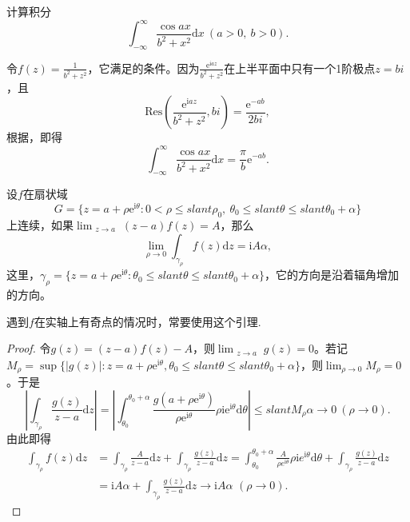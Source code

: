\documentclass[../../main.tex]{subfiles}
\begin{document}
\begin{example}
计算积分
\[
\int_{-\infty}^{\infty} \frac{\cos ax}{b^2 + x^2} \mathrm{d}x \ (a > 0, \ b > 0).
\]
\end{example}
\begin{solution}
令\( f(z) = \frac{1}{b^2 + z^2} \)，它满足的条件。因为\( \frac{\mathrm{e}^{\mathrm{i}az}}{b^2 + z^2} \)在上半平面中只有一个1阶极点\( z = bi \)，且
\[
\mathrm{Res}\left( \frac{\mathrm{e}^{\mathrm{i}az}}{b^2 + z^2}, bi \right) = \frac{\mathrm{e}^{-ab}}{2bi},
\]
根据，即得
\[
\int_{-\infty}^{\infty} \frac{\cos ax}{b^2 + x^2} \mathrm{d}x = \frac{\pi}{b} \mathrm{e}^{-ab}.
\]
\end{solution}

\begin{lemma}\label{lemma:引理5.5.9}
设$f$在扇状域
\[
G = \{ z = a + \rho \mathrm{e}^{\mathrm{i}\theta} : 0 < \rho \leqslant slant \rho_0, \ \theta_0 \leqslant slant \theta \leqslant slant \theta_0 + \alpha \}
\]
上连续，如果\(\lim_{\substack{z \to a}} (z - a)f(z) = A\)，那么
\[
\lim_{\rho \to 0} \int_{\gamma_{\rho}} f(z) \mathrm{d}z = \mathrm{i}A\alpha, \label{lem5.5.9_eq}
\]
这里，\(\gamma_{\rho} = \{ z = a + \rho \mathrm{e}^{\mathrm{i}\theta} : \theta_0 \leqslant slant \theta \leqslant slant \theta_0 + \alpha \}\)，它的方向是沿着辐角增加的方向。
\end{lemma}
\begin{remark}
遇到$f$在实轴上有奇点的情况时，常要使用这个引理.
\end{remark}
\begin{proof}
令\( g(z) = (z - a)f(z) - A \)，则\(\lim_{\substack{z \to a}} g(z) = 0\)。若记\( M_{\rho} = \sup\{ |g(z)| : z = a + \rho \mathrm{e}^{\mathrm{i}\theta}, \theta_0 \leqslant slant \theta \leqslant slant \theta_0 + \alpha \} \)，则\(\lim_{\rho \to 0} M_{\rho} = 0\)。于是
\[
\left| \int_{\gamma_{\rho}} \frac{g(z)}{z - a} \mathrm{d}z \right| = \left| \int_{\theta_0}^{\theta_0 + \alpha} \frac{g(a + \rho \mathrm{e}^{\mathrm{i}\theta})}{\rho \mathrm{e}^{\mathrm{i}\theta}} \rho \mathrm{i}\mathrm{e}^{\mathrm{i}\theta} \mathrm{d}\theta \right|
\leqslant slant M_{\rho}\alpha
\to 0 \ (\rho \to 0).
\]
由此即得
\begin{align*}
\int_{\gamma _{\rho}}{f(z)\mathrm{d}z}&=\int_{\gamma _{\rho}}{\frac{A}{z-a}\mathrm{d}z}+\int_{\gamma _{\rho}}{\frac{g(z)}{z-a}\mathrm{d}z}=\int_{\theta _0}^{\theta _0+\alpha}{\frac{A}{\rho e^{\mathrm{i}\theta}}\rho \mathrm{i}e^{\mathrm{i}\theta}\mathrm{d}\theta}+\int_{\gamma _{\rho}}{\frac{g(z)}{z-a}\mathrm{d}z}
\\
&=\mathrm{i}A\alpha +\int_{\gamma _{\rho}}{\frac{g(z)}{z-a}\mathrm{d}z}\rightarrow \mathrm{i}A\alpha \,\,(\rho \rightarrow 0).
\end{align*}
\end{proof}
\end{document}
